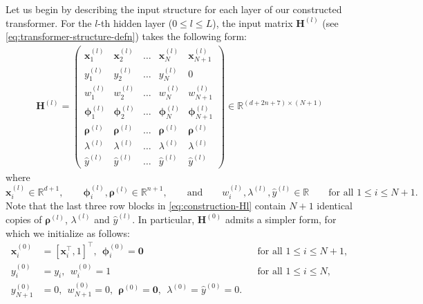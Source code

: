 \documentclass[english]{article}
\begin{document}
Let us begin by describing the input structure for each layer of our constructed transformer. 
For the $l$-th hidden layer ($0\leq l\leq L$), 
the input matrix $\bm{H}^{(l)}$ (see \eqref{eq:transformer-structure-defn}) takes the following form: 
%
\begin{align}
\label{eq:construction-Hl}
\bm{H}^{(l)} = \left( \begin{array}{ccccc}
{\bm x}_1^{(l)} & {\bm x}_2^{(l)} & \ldots & {\bm x}_N^{(l)} & {\bm x}_{N+1}^{(l)} \\
y_1^{(l)} & y_2^{(l)} & \ldots & y_N^{(l)} & 0 \\
{w}_1^{(l)} & {w}_2^{(l)} & \ldots & {w}_N^{(l)} & {w}_{N+1}^{(l)} \\
{\bm \phi}_1^{(l)} & {\bm \phi}_2^{(l)} & \ldots & {\bm \phi}_N^{(l)} & {\bm \phi}_{N+1}^{(l)} \\
{\bm \rho}^{(l)} & {\bm \rho}^{(l)} & \ldots & {\bm \rho}^{(l)} & {\bm \rho}^{(l)} \\
\lambda^{(l)} & \lambda^{(l)} & \ldots & \lambda^{(l)} & \lambda^{(l)} \\
\widehat{y}^{(l)} & \widehat{y}^{(l)} & \ldots & \widehat{y}^{(l)} & \widehat{y}^{(l)}
\end{array} \right)
\in \mathbb{R}^{(d+2n+7) \times (N+1)}
\end{align}
where 
%
$${\bm x}_i^{(l)}\in\mathbb{R}^{d+1}, \qquad {\bm \phi}_i^{(l)}, {\bm \rho}^{(l)} \in \mathbb{R}^{n+1}, \qquad \text{and}\qquad w_i^{(l)}, \lambda^{(l)}, \widehat{y}^{(l)} \in \mathbb{R}
\qquad \text{for all }1\leq i\leq N+1.
$$
%
Note that the last three row blocks in \eqref{eq:construction-Hl} contain $N+1$ identical copies of 
$\bm{\rho}^{(l)}$, $\lambda^{(l)}$ and $\widehat{y}^{(l)}$.   
In particular, $\bm{H}^{(0)}$ admits a simpler form,  
for which we initialize as follows: 
%
\begin{subequations}
\begin{align}
    {\bm x}_i^{(0)} &= [{\bm x}_i^{\top},1]^{\top}, ~~ \bm{\phi}_i^{(0)}=\bm{0} \quad &&\text{for all }1\leq i\leq N+1,  \\
    y_i^{(0)}&=y_i, ~~ w_i^{(0)}= 1 
    \quad &&\text{for all }1\leq i\leq N, \label{eq:edf-initial-yw}\\
     y_{N+1}^{(0)}& = 0,~~w_{N+1}^{(0)}= 0, ~~
    \bm{\rho}^{(0)}=\bm{0}, ~~ \lambda^{(0)}= \widehat{y}^{(0)}=0.\label{eq:edf-initial-wrholamyhat}
\end{align}
\end{subequations}
\end{document}
